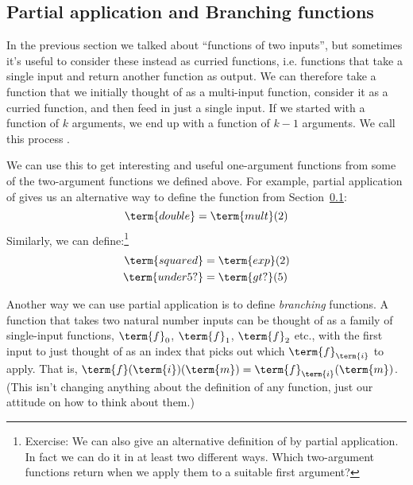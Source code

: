 

\subsection{Partial application and Branching functions}

In the previous section we talked about ``functions of two inputs'', but sometimes it's useful to consider these instead as curried functions, i.e. functions that take a single input and return another function as output.  We can therefore take a function that we initially thought of as a multi-input function, consider it as a curried function, and then feed in just a single input.  If we started with a function of $k$ arguments, we end up with a function of $k-1$ arguments.  We call this process .

We can use this to get interesting and useful one-argument functions from some of the two-argument functions we defined above.  For example, partial application of  gives us an alternative way to define the  function from Section~\ref{}:
\[
\term{double}	=	\term{mult}(2)
\]
Similarly, we can define:\footnote{
Exercise: We can also give an alternative definition of  by partial application.  In fact we can do it in at least two different ways.  Which two-argument functions return  when we apply them to a suitable first argument?
}
\begin{align*}
\term{squared}	&=	\term{exp}(2)
\\
\term{under5?}	&=	\term{gt?}(5)
\end{align*}

Another way we can use partial application is to define \emph{branching} functions.  A function  that takes two natural number inputs can be thought of as a family of single-input functions, $\term{f}_{0}$, $\term{f}_{1}$, $\term{f}_{2}$ etc., with the first input to  just thought of as an index  that picks out which $\term{f}_{\term{i}}$ to apply.  That is, $\term{f}(\term{i})(\term{m}) = \term{f}_{\term{i}}(\term{m})$.  (This isn't changing anything about the definition of any function, just our attitude on how to think about them.)

